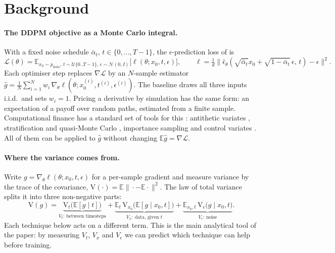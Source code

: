 \section{Background}
\label{sec:background}

\paragraph{The DDPM objective as a Monte Carlo integral.}
With a fixed noise schedule $\bar\alpha_t$, $t\in\{0,\dots,T-1\}$, the $\epsilon$-prediction loss of
\citet{ho2020ddpm} is
\begin{equation}
  \mathcal L(\theta)=\mathbb E_{x_0\sim p_{\text{data}},\,t\sim\mathcal U\{0..T-1\},\,\epsilon\sim\mathcal N(0,I)}
  \big[\ell(\theta;x_0,t,\epsilon)\big],\qquad
  \ell=\tfrac1d\big\|\hat\epsilon_\theta(\sqrt{\bar\alpha_t}x_0+\sqrt{1-\bar\alpha_t}\,\epsilon,\,t)-\epsilon\big\|^2 .
  \label{eq:loss}
\end{equation}
Each optimiser step replaces $\nabla\mathcal L$ by an $N$-sample estimator
$\hat g=\frac1N\sum_{i=1}^N w_i\,\nabla_\theta\ell(\theta;x_0^{(i)},t^{(i)},\epsilon^{(i)})$.
The baseline draws all three inputs i.i.d.\ and sets $w_i=1$. Pricing a derivative by simulation has the
same form: an expectation of a payoff over random paths, estimated from a finite sample. Computational
finance has a standard set of tools for this \citep{glasserman2003}: antithetic variates \citep{boyle1977},
stratification and quasi-Monte Carlo \citep{paskov1995}, importance sampling \citep{ghs1999} and control
variates \citep{kemna1990}. All of them can be applied to $\hat g$ without changing
$\mathbb E\hat g=\nabla\mathcal L$.

\paragraph{Where the variance comes from.}
Write $g=\nabla_\theta\ell(\theta;x_0,t,\epsilon)$ for a per-sample gradient and measure variance by the trace of
the covariance, $\mathrm{V}(\cdot)=\mathbb E\|\cdot-\mathbb E\cdot\|^2$. The law of total variance splits it into three
non-negative parts:
\begin{equation}
  \mathrm V(g)=\underbrace{\mathrm V_t\big(\mathbb E[g\mid t]\big)}_{V_t:\ \text{between timesteps}}
  +\underbrace{\mathbb E_t\,\mathrm V_{x_0}\big(\mathbb E[g\mid x_0,t]\big)}_{V_x:\ \text{data, given }t}
  +\underbrace{\mathbb E_{x_0,t}\,\mathrm V_\epsilon\big(g\mid x_0,t\big)}_{V_\epsilon:\ \text{noise}} .
  \label{eq:decomp}
\end{equation}
Each technique below acts on a different term. This is the main analytical tool of the paper:
by measuring $V_t$, $V_x$ and $V_\epsilon$ we can predict which technique can help before training.

